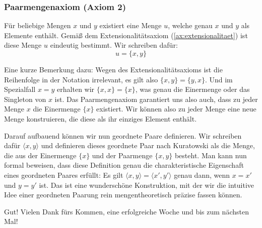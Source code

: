 \subsubsection{Paarmengenaxiom (Axiom 2)}
\begin{math-stroke}
\begin{axiom}[Paarmengenaxiom]\label[axiom]{ax:paarmenge}
\[ \forall x \forall y \exists u \forall z \, (z \in u \leftrightarrow z = x \lor z = y) \]
\end{axiom}

\begin{explanation-of-steps}
Für beliebige Mengen $x$ und $y$ existiert eine Menge $u$, welche genau $x$ und $y$ als Elemente enthält. Gemäß dem Extensionalitätsaxiom (\ref{ax:extensionalitaet}) ist diese Menge $u$ eindeutig bestimmt. Wir schreiben dafür:
\[ u = \{x, y\} \]
\end{explanation-of-steps}
\end{math-stroke}

\begin{spoken-clean}[01:29:00 - 01:30:45]
Eine kurze Bemerkung dazu: Wegen des Extensionalitätsaxioms ist die Reihenfolge in der Notation irrelevant, es gilt also $\{x, y\} = \{y, x\}$. Und im Spezialfall $x = y$ erhalten wir $\{x, x\} = \{x\}$, was genau die Einermenge oder das Singleton von $x$ ist. Das Paarmengenaxiom garantiert uns also auch, dass zu jeder Menge $x$ die Einermenge $\{x\}$ existiert. Wir können also zu jeder Menge eine neue Menge konstruieren, die diese als ihr einziges Element enthält.

Darauf aufbauend können wir nun geordnete Paare definieren. Wir schreiben dafür $\langle x, y \rangle$ und definieren dieses geordnete Paar nach Kuratowski als die Menge, die aus der Einermenge $\{x\}$ und der Paarmenge $\{x, y\}$ besteht. Man kann nun formal beweisen, dass diese Definition genau die charakteristische Eigenschaft eines geordneten Paares erfüllt: Es gilt $\langle x, y \rangle = \langle x', y' \rangle$ genau dann, wenn $x = x'$ und $y = y'$ ist. Das ist eine wunderschöne Konstruktion, mit der wir die intuitive Idee einer geordneten Paarung rein mengentheoretisch präzise fassen können.

Gut! Vielen Dank fürs Kommen, eine erfolgreiche Woche und bis zum nächsten Mal!
\end{spoken-clean}


